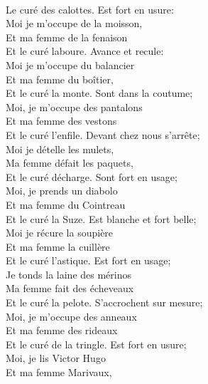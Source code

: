 \\Le curé des calottes. \bissimple
{}
{Est fort en usure:}
\\Moi je m'occupe de la moisson, \bissimple
\\Et ma femme de la fenaison \bissimple
\\Et le curé laboure. \bissimple
{}
{Avance et recule:}
\\Moi je m'occupe du balancier \bissimple
\\Et ma femme du boîtier, \bissimple
\\Et le curé la monte. \bissimple
{}
{Sont dans la coutume;}
\\Moi, je m'occupe des pantalons \bissimple
\\Et ma femme des vestons \bissimple
\\Et le curé l'enfile. \bissimple
{}
{Devant chez nous s'arrête;}
\\Moi je dételle les mulets, \bissimple
\\Ma femme défait les paquets, \bissimple
\\Et le curé décharge. \bissimple
{}
{Sont fort en usage;}
\\Moi, je prends un diabolo \bissimple
\\Et ma femme du Cointreau \bissimple
\\Et le curé la Suze. \bissimple
{}
{Est blanche et fort belle;}
\\Moi je récure la soupière \bissimple
\\Et ma femme la cuillère \bissimple
\\Et le curé l'astique. \bissimple
\breakpage
{}
{Est fort en usage;}
\\Je tonds la laine des mérinos \bissimple
\\Ma femme fait des écheveaux \bissimple
\\Et le curé la pelote. \bissimple
{}
{S'accrochent sur mesure;}
\\Moi, je m'occupe des anneaux \bissimple
\\Et ma femme des rideaux \bissimple
\\Et le curé de la tringle. \bissimple
{}
{Est fort en usure;}
\\Moi, je lis Victor Hugo \bissimple
\\Et ma femme Marivaux, \bissimple
